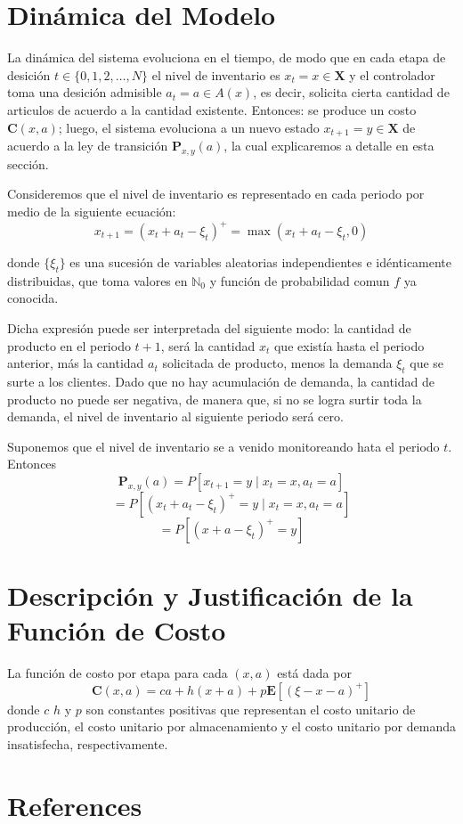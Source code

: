 \documentclass[
  letterpaper,
  DIV=11,
  numbers=noendperiod]{scrreprt}
\newlength{\cslhangindent}
\newenvironment{CSLReferences}[2] %
 {\begin{list}{}{%
  \setlength{\itemindent}{0pt}
  \setlength{\leftmargin}{0pt}
  \setlength{\parsep}{0pt}
  \ifodd #1
   \setlength{\leftmargin}{\cslhangindent}
   \setlength{\itemindent}{-1\cslhangindent}
  \fi
  \setlength{\itemsep}{#2\baselineskip}}}
 {\end{list}}
\begin{document}

\chapter{Dinámica del Modelo}\label{dinuxe1mica-del-modelo}

La dinámica del sistema evoluciona en el tiempo, de modo que en cada
etapa de desición \(t\in \{ 0,1,2, \dotso,N \}\) el nivel de inventario
es \(x_t=x \in \mathbf{X}\) y el controlador toma una desición admisible
\(a_t= a \in A(x)\), es decir, solicita cierta cantidad de articulos de
acuerdo a la cantidad existente. Entonces: se produce un costo
\(\mathbf{C}(x,a)\); luego, el sistema evoluciona a un nuevo estado
\(x_{t+1}=y \in \mathbf{X}\) de acuerdo a la ley de transición
\(\mathbf{P}_{x,y}(a)\), la cual explicaremos a detalle en esta sección.

Consideremos que el nivel de inventario es representado en cada periodo
por medio de la siguiente ecuación:
\[x_{t+1}=(x_t+a_t-\xi_t)^{+}=\max(x_t+a_t-\xi_t,0)\]

donde \(\{ \xi_t\}\) es una sucesión de variables aleatorias
independientes e idénticamente distribuidas, que toma valores en
\(\mathbb{N}_{0}\) y función de probabilidad comun \(f\) ya conocida.

Dicha expresión puede ser interpretada del siguiente modo: la cantidad
de producto en el periodo \(t+1\), será la cantidad \(x_t\) que existía
hasta el periodo anterior, más la cantidad \(a_t\) solicitada de
producto, menos la demanda \(\xi_t\) que se surte a los clientes. Dado
que no hay acumulación de demanda, la cantidad de producto no puede ser
negativa, de manera que, si no se logra surtir toda la demanda, el nivel
de inventario al siguiente periodo será cero.

Suponemos que el nivel de inventario se a venido monitoreando hata el
periodo \(t\). Entonces \[
\mathbf{P}_{x,y}(a)= P[x_{t+1}=y \mid x_t=x, a_t=a]
\] \[
=P[(x_t+a_t-\xi_t)^{+}=y \mid x_t=x, a_t=a]
\] \[
=P[(x+a-\xi_t)^{+}=y]
\]


\chapter{Descripción y Justificación de la Función de
Costo}\label{descripciuxf3n-y-justificaciuxf3n-de-la-funciuxf3n-de-costo}

La función de costo por etapa para cada \((x,a)\) está dada por \[
\mathbf{C}(x,a)=ca+h(x+a)+p\mathbf{E}[(\xi-x-a)^+]
\] donde \(c\) \(h\) y \(p\) son constantes positivas que representan el
costo unitario de producción, el costo unitario por almacenamiento y el
costo unitario por demanda insatisfecha, respectivamente.


\chapter*{References}\label{references}


\label{refs}
\begin{CSLReferences}{0}{1}
\end{CSLReferences}
\end{document}
